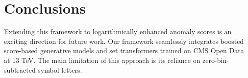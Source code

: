 \section{Conclusions}\label{sec:conclusions}

Extending this framework to logarithmically enhanced anomaly scores is
an exciting direction for future work. Our framework seamlessly
integrates boosted score-based generative models and set transformers
trained on CMS Open Data at 13 TeV. The main limitation of this approach
is its reliance on zero-bin-subtracted symbol letters.

